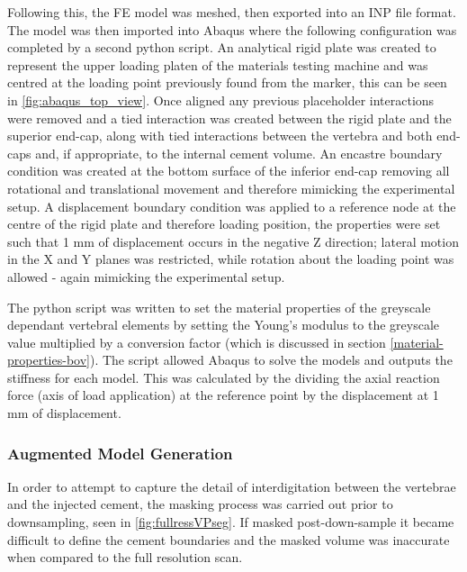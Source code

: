 Following this, the FE model was meshed, then exported into an INP file format.
The model was then imported into Abaqus where the following configuration was
completed by a second python script. An analytical rigid plate was created to
represent the upper loading platen of the materials testing machine and was
centred at the loading point previously found from the marker, this can be seen
in \cref{fig:abaqus_top_view}. Once aligned any previous placeholder
interactions were removed and a tied interaction was created between the rigid
plate and the superior end-cap, along with tied interactions between the
vertebra and both end-caps and, if appropriate, to the internal cement volume.
An encastre boundary condition was created at the bottom surface of the
inferior end-cap removing all rotational and translational movement and
therefore mimicking the experimental setup. A displacement boundary condition
was applied to a reference node at the centre of the rigid plate and therefore
loading position, the properties were set such that 1 mm of displacement occurs
in the negative Z direction; lateral motion in the X and Y planes was
restricted, while rotation about the loading point was allowed - again
mimicking the experimental setup.

The python script was written to set the material properties of the greyscale
dependant vertebral elements by setting the Young's modulus to the greyscale
value multiplied by a conversion factor (which is discussed in section
\ref{material-properties-bov}). The script allowed Abaqus to solve the models
and outputs the stiffness for each model. This was calculated by the dividing
the axial reaction force (axis of load application) at the reference point by
the displacement at 1 mm of displacement.

\subsubsection{Augmented Model Generation}

In order to attempt to capture the detail of interdigitation between the
vertebrae and the injected cement, the masking process was carried out prior to
downsampling, seen in \cref{fig:fullressVPseg}. If masked post-down-sample it
became difficult to define the cement boundaries and the masked volume was
inaccurate when compared to the full resolution scan.


